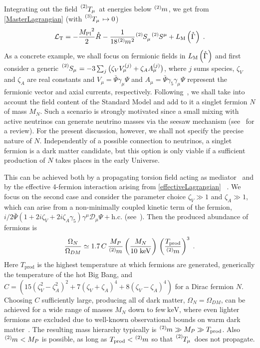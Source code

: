 \documentclass[aps,prd,reprint,preprintnumbers,showpacs,floatfix,nofootinbib,superscript address,longbibliography]{revtex4-1}
\begin{document}
Integrating out the field $\T[2]{_{\mu}}$ at energies below $\mass[2]{}$, we get from \eq \eqref{MasterLagrangian} (with  $\T[3]{_{\mu}}\mapsto 0$)
\begin{equation} \label{effectiveLagrangian}
	\mathcal{L}_{\text{T}} = - \frac{\Planck^2}{2}  \rR{} - \frac{1}{18 \mass[2]{}^2} \Si[2]{_{\mu}} \Si[2]{^{\mu}} + 	L_{\text{M}}\left(\rCon{}\right) \;.
\end{equation}
As a concrete example, we shall focus on fermionic fields in $L_{\text{M}}\left(\rCon{}\right)$ and first consider a generic $\Si[2]{_{\mu}} = -3 \sum_j \big(\zeta_V V^{(j)}_\mu + \zeta_A A^{(j)}_\mu\big)$, where $j$ sums species, $\zeta_V$ and $\zeta_A$ are real constants and $V_\mu = \bar{\Psi} \gamma_\mu \Psi$ and $A_\mu = \bar{\Psi} \gamma_5 \gamma_\mu \Psi$ represent the fermionic vector and axial currents, respectively. Following~\cite{Shaposhnikov:2020aen}, we shall take into account the field content of the Standard Model and add to it a singlet fermion $N$ of mass $M_N$. Such a scenario is strongly motivated since a small mixing with active neutrinos can generate neutrino masses via the seesaw mechanism (see~\cite{Boyarsky:2018tvu} for a review). For the present discussion, however, we shall not specify the precise nature of $N$. Independently of a possible connection to neutrinos, a singlet fermion is a dark matter candidate, but this option is only viable if a sufficient production of $N$ takes places in the early Universe. 

This can be achieved both by a propagating torsion field acting as mediator~\cite{Barman:2019mlj} and by the effective 4-fermion interaction arising from \eq \eqref{effectiveLagrangian} ~\cite{Shaposhnikov:2020aen}. We focus on the second case and consider the parameter choice $\zeta_V \gg 1$ and $\zeta_A \gg 1$, which can arise from a non-minimally coupled kinetic term of the fermion, $i/2 \bar{\Psi} (1+ 2 i \zeta_V + 2 i \zeta_A \gamma_5) \gamma^\mu \mathcal{D}_\mu \Psi + \text{h.c.}$ (see~\cite{Shaposhnikov:2020frq,Karananas:2021zkl,Rigouzzo:2023sbb}).  Then the produced abundance of fermions is~\cite{Shaposhnikov:2020aen}
\begin{equation}
	\frac{\Omega_N}{\Omega_{DM}}\simeq 1.7 \, C \, \frac{M_P}{\mass[2]{}} \left( \frac{M_N}{10~\text{keV}}\right) \, \left( \frac{T_\mathrm{prod}}{\mass[2]{}} \right)^3 \;.
	\label{darkMatterAbundance}
\end{equation}
Here $T_\mathrm{prod}$ is the highest temperature at which fermions are generated, \ie generically the temperature of the hot Big Bang, and $C = \left(15(\zeta_V^2 - \zeta_A^2)^2 + 7(\zeta_V + \zeta_A)^4 + 8 (\zeta_V - \zeta_A)^4\right)$ for a Dirac fermion $N$. Choosing $C$ sufficiently large, producing all of dark matter, $\Omega_N=\Omega_{DM}$, can be achieved for a wide range of masses $M_N$ down to $\text{few}~\text{keV}$, where even lighter fermions are excluded due to well-known observational bounds on warm dark matter~\cite{Garzilli:2018jqh, Garzilli:2019qki}. The resulting mass hierarchy typically is $\mass[2]{}\gg M_P \gg T_\mathrm{prod}$. Also $\mass[2]{}< M_P$ is possible, as long as $T_\mathrm{prod}<\mass[2]{}$ so that $\T[2]{_{\mu}}$ does not propagate.
\end{document}
